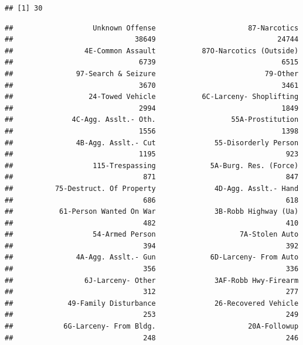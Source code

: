 \documentclass[]{book}
\newenvironment{Shaded}{\begin{snugshade}}{\end{snugshade}}
\newcommand{\KeywordTok}[1]{\textcolor[rgb]{0.13,0.29,0.53}{\textbf{#1}}}
\newcommand{\CommentTok}[1]{\textcolor[rgb]{0.56,0.35,0.01}{\textit{#1}}}
\newcommand{\OperatorTok}[1]{\textcolor[rgb]{0.81,0.36,0.00}{\textbf{#1}}}
\newcommand{\NormalTok}[1]{#1}
\theoremstyle{definition}
\theoremstyle{definition}
\theoremstyle{remark}
\begin{document}
\begin{verbatim}
## [1] 30
\end{verbatim}

\begin{Shaded}
\end{Shaded}

\begin{verbatim}
##                   Unknown Offense                      87-Narcotics 
##                             38649                             24744 
##                 4E-Common Assault           87O-Narcotics (Outside) 
##                              6739                              6515 
##               97-Search & Seizure                          79-Other 
##                              3670                              3461 
##                  24-Towed Vehicle           6C-Larceny- Shoplifting 
##                              2994                              1849 
##              4C-Agg. Asslt.- Oth.                  55A-Prostitution 
##                              1556                              1398 
##               4B-Agg. Asslt.- Cut              55-Disorderly Person 
##                              1195                               923 
##                   115-Trespassing             5A-Burg. Res. (Force) 
##                               871                               847 
##          75-Destruct. Of Property              4D-Agg. Asslt.- Hand 
##                               686                               618 
##           61-Person Wanted On War              3B-Robb Highway (Ua) 
##                               482                               410 
##                   54-Armed Person                    7A-Stolen Auto 
##                               394                               392 
##               4A-Agg. Asslt.- Gun             6D-Larceny- From Auto 
##                               356                               336 
##                 6J-Larceny- Other              3AF-Robb Hwy-Firearm 
##                               312                               277 
##             49-Family Disturbance              26-Recovered Vehicle 
##                               253                               249 
##            6G-Larceny- From Bldg.                      20A-Followup 
##                               248                               246 

\end{verbatim}
\end{document}
